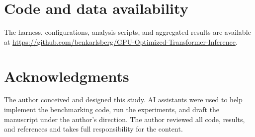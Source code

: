 \documentclass[11pt]{article}
\begin{document}
\section*{Code and data availability}
The harness, configurations, analysis scripts, and aggregated results are available at \url{https://github.com/benkarlsberg/GPU-Optimized-Transformer-Inference}.

\section*{Acknowledgments}
The author conceived and designed this study. AI assistants were used to help implement the benchmarking code, run the experiments, and draft the manuscript under the author's direction. The author reviewed all code, results, and references and takes full responsibility for the content.
\end{document}
